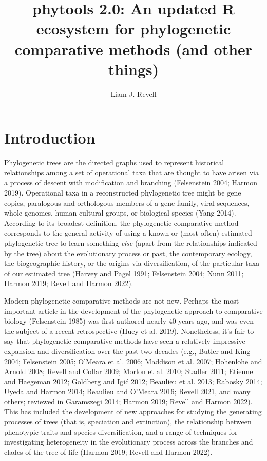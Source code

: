 \documentclass[fleqn,10pt,lineno]{wlpeerj} %
\title{phytools 2.0: An updated R ecosystem for phylogenetic comparative methods (and other things)}
\author[1, 2]{Liam J. Revell}
\affil[1]{Department of Biology, University of Massachusetts Boston, Boston, MA, USA}
\affil[2]{Facultad de Ciencias, Universidad Católica de la Santísima Concepción, Concepción, Chile}
\begin{document}
\flushbottom
\maketitle
\thispagestyle{empty}

\hypertarget{introduction}{%
\section{Introduction}\label{introduction}}

Phylogenetic trees are the directed graphs used to represent historical relationships among a set of operational taxa that are thought to have arisen via a process of descent with modification and branching (Felsenstein 2004; Harmon 2019). Operational taxa in a reconstructed phylogenetic tree might be gene copies, paralogous and orthologous members of a gene family, viral sequences, whole genomes, human cultural groups, or biological species (Yang 2014). According to its broadest definition, the phylogenetic comparative method corresponds to the general activity of using a known or (most often) estimated phylogenetic tree to learn something \emph{else} (apart from the relationships indicated by the tree) about the evolutionary process or past, the contemporary ecology, the biogeographic history, or the origins via diversification, of the particular taxa of our estimated tree (Harvey and Pagel 1991; Felsenstein 2004; Nunn 2011; Harmon 2019; Revell and Harmon 2022).

Modern phylogenetic comparative methods are not new. Perhaps the most important article in the development of the phylogenetic approach to comparative biology (Felsenstein 1985) was first authored nearly 40 years ago, and was even the subject of a recent retrospective (Huey et al. 2019). Nonetheless, it's fair to say that phylogenetic comparative methods have seen a relatively impressive expansion and diversification over the past two decades (e.g., Butler and King 2004; Felsenstein 2005; O'Meara et al. 2006; Maddison et al. 2007; Hohenlohe and Arnold 2008; Revell and Collar 2009; Morlon et al. 2010; Stadler 2011; Etienne and Haegeman 2012; Goldberg and Igić 2012; Beaulieu et al. 2013; Rabosky 2014; Uyeda and Harmon 2014; Beaulieu and O'Meara 2016; Revell 2021, and many others; reviewed in Garamszegi 2014; Harmon 2019; Revell and Harmon 2022). This has included the development of new approaches for studying the generating processes of trees (that is, speciation and extinction), the relationship between phenotypic traits and species diversification, and a range of techniques for investigating heterogeneity in the evolutionary process across the branches and clades of the tree of life (Harmon 2019; Revell and Harmon 2022).
\end{document}
